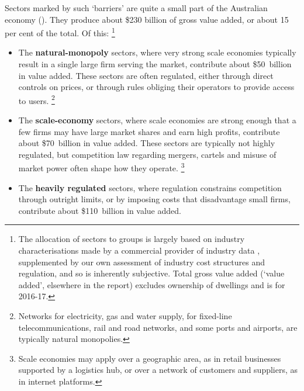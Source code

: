 Sectors marked by such `barriers' are quite a small part of the Australian economy (). They produce about \$230 billion of gross value added, or about 15 per cent of the total. Of this:%
    \footnote{The allocation of sectors to groups is largely based on industry characterisations made by a commercial provider of industry data \parencite{IBISWorldIndustry2017,IBISWorldCompany2017}, supplemented by our own assessment of industry cost structures and regulation, and so is inherently subjective. Total gross value added (`value added', elsewhere in the report) excludes ownership of dwellings and is for  2016-17.}

\begin{itemize}
    \item The \textbf{natural-monopoly} sectors, where very strong scale economies typically result in a single large firm serving the market, contribute about \$50~billion in value added. These sectors are often regulated, either through direct controls on prices, or through rules obliging their operators to provide access to users.%
        \footnote{Networks for electricity, gas and water supply, for fixed-line telecommunications, rail and road networks, and some ports and airports, are typically natural monopolies.}
    \item The \textbf{scale-economy} sectors, where scale economies are strong enough that a few firms may have large market shares and earn high profits, contribute about \$70~billion in value added. These sectors are typically not highly regulated, but competition law regarding mergers, cartels and misuse of market power often shape how they operate.%
        \footnote{Scale economies may apply over a geographic area, as in retail businesses supported by a logistics hub, or over a network of customers and suppliers, as in internet platforms.}
    \item The \textbf{heavily regulated} sectors, where regulation constrains competition through outright limits, or by imposing costs that disadvantage small firms, contribute about \$110~billion in value added.%
\end{itemize}

